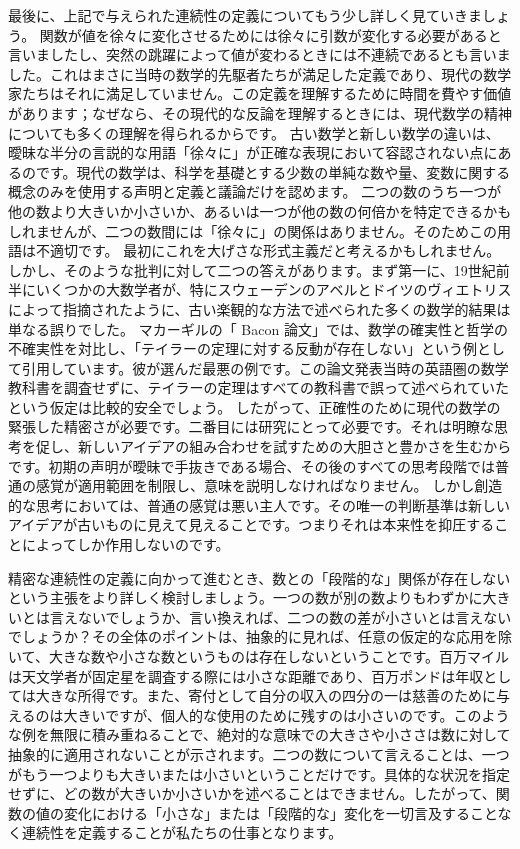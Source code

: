 \documentclass[a4paper,11pt,openany]{ltjsbook}
\begin{document}
最後に、上記で与えられた連続性の定義についてもう少し詳しく見ていきましょう。
関数が値を徐々に変化させるためには徐々に引数が変化する必要があると言いましたし、突然の跳躍によって値が変わるときには不連続であるとも言いました。これはまさに当時の数学的先駆者たちが満足した定義であり、現代の数学家たちはそれに満足していません。この定義を理解するために時間を費やす価値があります；なぜなら、その現代的な反論を理解するときには、現代数学の精神についても多くの理解を得られるからです。
古い数学と新しい数学の違いは、曖昧な半分の言説的な用語「徐々に」が正確な表現において容認されない点にあるのです。現代の数学は、科学を基礎とする少数の単純な数や量、変数に関する概念のみを使用する声明と定義と議論だけを認めます。
二つの数のうち一つが他の数より大きいか小さいか、あるいは一つが他の数の何倍かを特定できるかもしれませんが、二つの数間には「徐々に」の関係はありません。そのためこの用語は不適切です。
最初にこれを大げさな形式主義だと考えるかもしれません。しかし、そのような批判に対して二つの答えがあります。まず第一に、19世紀前半にいくつかの大数学者が、特にスウェーデンのアベルとドイツのヴィエトリスによって指摘されたように、古い楽観的な方法で述べられた多くの数学的結果は単なる誤りでした。
マカーギルの「 Bacon 論文」では、数学の確実性と哲学の不確実性を対比し、「テイラーの定理に対する反動が存在しない」という例として引用しています。彼が選んだ最悪の例です。この論文発表当時の英語圏の数学教科書を調査せずに、テイラーの定理はすべての教科書で誤って述べられていたという仮定は比較的安全でしょう。
したがって、正確性のために現代の数学の緊張した精密さが必要です。二番目には研究にとって必要です。それは明瞭な思考を促し、新しいアイデアの組み合わせを試すための大胆さと豊かさを生むからです。初期の声明が曖昧で手抜きである場合、その後のすべての思考段階では普通の感覚が適用範囲を制限し、意味を説明しなければなりません。
しかし創造的な思考においては、普通の感覚は悪い主人です。その唯一の判断基準は新しいアイデアが古いものに見えて見えることです。つまりそれは本来性を抑圧することによってしか作用しないのです。

精密な連続性の定義に向かって進むとき、数との「段階的な」関係が存在しないという主張をより詳しく検討しましょう。一つの数が別の数よりもわずかに大きいとは言えないでしょうか、言い換えれば、二つの数の差が小さいとは言えないでしょうか？その全体のポイントは、抽象的に見れば、任意の仮定的な応用を除いて、大きな数や小さな数というものは存在しないということです。百万マイルは天文学者が固定星を調査する際には小さな距離であり、百万ポンドは年収としては大きな所得です。また、寄付として自分の収入の四分の一は慈善のために与えるのは大きいですが、個人的な使用のために残すのは小さいのです。このような例を無限に積み重ねることで、絶対的な意味での大きさや小ささは数に対して抽象的に適用されないことが示されます。二つの数について言えることは、一つがもう一つよりも大きいまたは小さいということだけです。具体的な状況を指定せずに、どの数が大きいか小さいかを述べることはできません。したがって、関数の値の変化における「小さな」または「段階的な」変化を一切言及することなく連続性を定義することが私たちの仕事となります。
\end{document}
